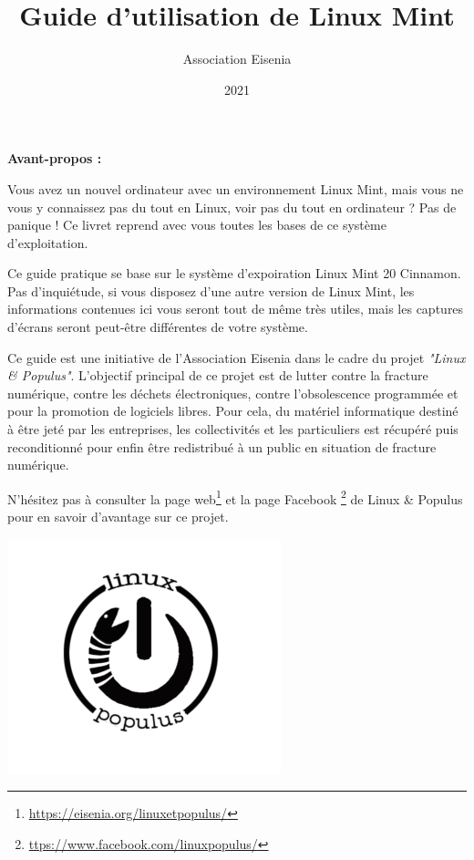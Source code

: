 \documentclass[12pt]{book}
\title{Guide d'utilisation de Linux Mint}
\author{Association Eisenia}
\date{2021}
\begin{document}
\renewcommand{\contentsname}{Table des matières}
\renewcommand{\tablename}{\textsc{Tableau}}
\renewcommand{\figurename}{\textsc{Capture d'écran}}
\renewcommand{\chaptername}{Chapitre}

\newpage
	\begin{center}
		\textbf{Avant-propos :}
	\end{center}\par
	Vous avez un nouvel ordinateur avec un environnement Linux Mint, mais vous ne vous y connaissez pas du tout en Linux, voir pas du tout en ordinateur ?
	Pas de panique ! 
	Ce livret reprend avec vous toutes les bases de ce système d'exploitation.\par
	Ce guide pratique se base sur le système d'expoiration Linux Mint 20 Cinnamon.
	Pas d'inquiétude, si vous disposez d'une autre version de Linux Mint, les informations contenues ici vous seront tout de même très utiles, mais les captures d'écrans seront peut-être différentes de votre système.\par
	\medskip
	Ce guide est une initiative de l'Association Eisenia dans le cadre du projet \textit{"Linux \& Populus"}.
	L'objectif principal de ce projet est de lutter contre la fracture numérique, contre les déchets électroniques, contre l'obsolescence programmée et pour la promotion de logiciels libres.
	Pour cela, du matériel informatique destiné à être jeté par les entreprises, les collectivités et les particuliers est récupéré puis reconditionné pour enfin être redistribué à un public en situation de fracture numérique.\par
	N'hésitez pas à consulter la page web\footnote{\href{https://eisenia.org/linuxetpopulus/}{https://eisenia.org/linuxetpopulus/}} et la page Facebook \footnote{\href{https://www.facebook.com/linuxpopulus/}{ttps://www.facebook.com/linuxpopulus/}} de Linux \& Populus pour en savoir d'avantage sur ce projet.
	\vfill
	\begin{center}
		\includegraphics[scale=.5]{include/linuxpop.png}
	\end{center}
	\vfill
\end{document}
